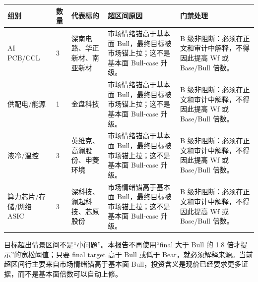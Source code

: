 \begin{exhibitbox}
\begin{tabularx}{\linewidth}{L{2.2cm}R{0.8cm}L{3.2cm}X X}
\toprule
\textbf{组别} & \textbf{数量} & \textbf{代表标的} & \textbf{超区间原因} & \textbf{门禁处理}\\
\midrule
AI PCB/CCL & 3 & 深南电路、华正新材、南亚新材 & 市场情绪锚高于基本面 Bull，最终目标被市场锚上拉；这不是基本面 Bull-case 升级。 & B 级非阻断：必须在正文和审计中解释，不得因此提高 Wf 或 Base/Bull 倍数。\\
供配电/能源 & 1 & 金盘科技 & 市场情绪锚高于基本面 Bull，最终目标被市场锚上拉；这不是基本面 Bull-case 升级。 & B 级非阻断：必须在正文和审计中解释，不得因此提高 Wf 或 Base/Bull 倍数。\\
液冷/温控 & 3 & 英维克、高澜股份、申菱环境 & 市场情绪锚高于基本面 Bull，最终目标被市场锚上拉；这不是基本面 Bull-case 升级。 & B 级非阻断：必须在正文和审计中解释，不得因此提高 Wf 或 Base/Bull 倍数。\\
算力芯片/存储/网络 ASIC & 3 & 深科技、澜起科技、芯原股份 & 市场情绪锚高于基本面 Bull，最终目标被市场锚上拉；这不是基本面 Bull-case 升级。 & B 级非阻断：必须在正文和审计中解释，不得因此提高 Wf 或 Base/Bull 倍数。\\
\bottomrule
\end{tabularx}
\end{exhibitbox}

目标超出情景区间不是“小问题”。本报告不再使用“final 大于 Bull 的 1.8 倍才提示”的宽松阈值；只要 final target 高于 Bull 或低于 Bear，就必须解释来源。当前超区间行主要来自市场情绪锚高于基本面 Bull，投资含义是现价已经要求更多证据，而不是基本面倍数可以自动上修。

